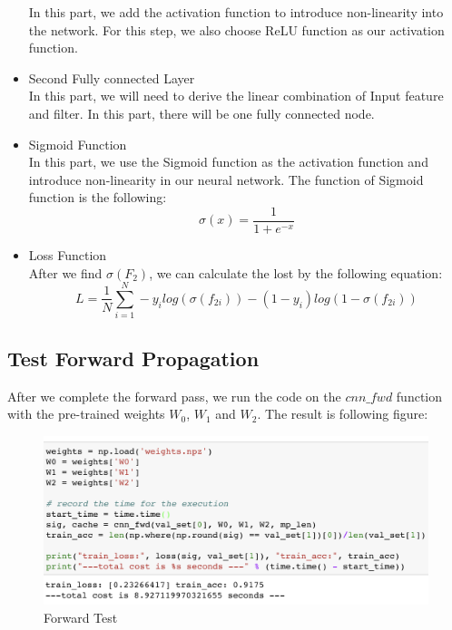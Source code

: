 \documentclass[12pt]{article}
\begin{document}
\begin{itemize}
			In this part, we add the activation function to introduce non-linearity into the network. For this step, we also choose ReLU function as our activation function.
			\item Second Fully connected Layer \\
			In this part, we will need to derive the linear combination of Input feature and filter. In this part, there will be one fully connected node.
			\item Sigmoid Function \\
			In this part, we use the Sigmoid function as the activation function and introduce non-linearity in our neural network. The function of Sigmoid function is the following:
			$$\sigma(x) = \frac{1}{1+e^{-x}}$$
			\item Loss Function \\
			After we find $\sigma(F_2)$, we can calculate the lost by the following equation:
			$$L = \frac{1}{N}\sum_{i=1}^N -y_ilog(\sigma(f_{2i})) - (1-y_i)log(1-\sigma(f_{2i}))$$
		\end{itemize}

	\subsection*{Test Forward Propagation}
		After we complete the forward pass, we run the code on the $cnn\_fwd$ function with the pre-trained weights $W_0$, $W_1$ and $W_2$. The result is following figure:
		\begin{figure}[ht]
			\begin{center}
				\includegraphics[width = 13cm]{forward_test}
			\end{center}
			\caption{Forward Test}
		\end{figure}
\end{document}
